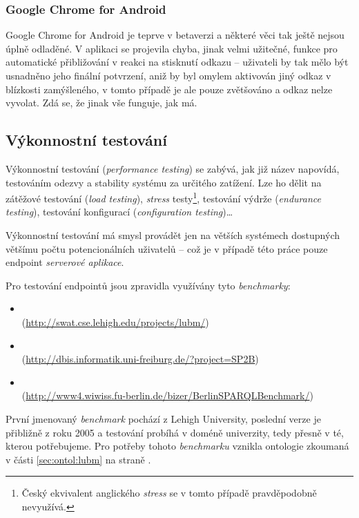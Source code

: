 \subsubsection*{Google Chrome for Android}
Google Chrome for Android je teprve v betaverzi a některé věci tak ještě nejsou úplně odladěné. V aplikaci se projevila chyba, jinak velmi užitečné, funkce pro automatické přibližování v reakci na stisknutí odkazu -- uživateli by tak mělo být usnadněno jeho finální potvrzení, aniž by byl omylem aktivován jiný odkaz v blízkosti zamýšleného, v tomto případě je ale pouze zvětšováno a odkaz nelze vyvolat. Zdá se, že jinak vše funguje, jak má.


\subsection{Výkonnostní testování}
Výkonnostní testování (\textit{performance testing}) se zabývá, jak již název napovídá, testováním odezvy a stability systému za určitého zatížení. Lze ho dělit na zátěžové testování (\textit{load testing}), \textit{stress} testy\footnote{Český ekvivalent anglického \textit{stress} se v tomto případě pravděpodobně nevyužívá.}, testování výdrže (\textit{endurance testing}), testování konfigurací (\textit{configuration testing})\dots

Výkonnostní testování má smysl provádět jen na větších systémech dostupných většímu počtu potencionálních uživatelů -- což je v případě této práce pouze  endpoint \textit{serverové aplikace}.

Pro testování  endpointů jsou zpravidla využívány tyto \textit{benchmarky}:

\begin{itemize}
 \item {}\\ (\url{http://swat.cse.lehigh.edu/projects/lubm/})
 \item {}\\ (\url{http://dbis.informatik.uni-freiburg.de/?project=SP2B})
 \item {}\\ (\url{http://www4.wiwiss.fu-berlin.de/bizer/BerlinSPARQLBenchmark/})
\end{itemize}

První jmenovaný \textit{benchmark} pochází z Lehigh University, poslední verze je přibližně z roku 2005 a testování probíhá v doméně univerzity, tedy přesně v té, kterou potřebujeme. Pro potřeby tohoto \textit{benchmarku} vznikla ontologie zkoumaná v části \ref{sec:ontol:lubm} na straně \pageref{sec:ontol:lubm}.

